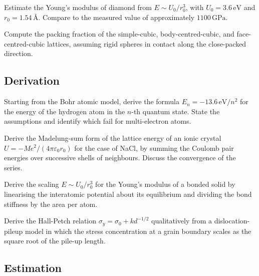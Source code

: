 \begin{exercise}
Estimate the Young's modulus of diamond from $E \sim U_0/r_0^3$, with
$U_0 = 3.6\,\text{eV}$ and $r_0 = 1.54\,\si{\angstrom}$. Compare to
the measured value of approximately $1100\,\text{GPa}$.
\end{exercise}

\begin{exercise}
Compute the packing fraction of the simple-cubic, body-centred-cubic,
and face-centred-cubic lattices, assuming rigid spheres in contact
along the close-packed direction.
\end{exercise}

\subsection*{Derivation}

\begin{exercise}
Starting from the Bohr atomic model, derive the formula $E_n = -13.6\,
\text{eV}/n^2$ for the energy of the hydrogen atom in the $n$-th
quantum state. State the assumptions and identify which fail for
multi-electron atoms.
\end{exercise}

\begin{exercise}
Derive the Madelung-sum form of the lattice energy of an ionic crystal
$U = -M e^2/(4\pi\varepsilon_0 r_0)$ for the case of NaCl, by
summing the Coulomb pair energies over successive shells of neighbours.
Discuss the convergence of the series.
\end{exercise}

\begin{exercise}
Derive the scaling $E \sim U_0/r_0^3$ for the Young's modulus of a
bonded solid by linearising the interatomic potential about its
equilibrium and dividing the bond stiffness by the area per atom.
\end{exercise}

\begin{exercise}
Derive the Hall-Petch relation $\sigma_y = \sigma_0 + k d^{-1/2}$
qualitatively from a dislocation-pileup model in which the
stress concentration at a grain boundary scales as the square root of
the pile-up length.
\end{exercise}

\subsection*{Estimation}

